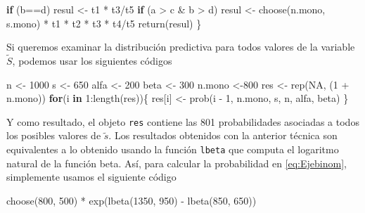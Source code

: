 \documentclass[
  spanish,
]{book}
\newenvironment{Shaded}{\begin{snugshade}}{\end{snugshade}}
\newcommand{\ConstantTok}[1]{\textcolor[rgb]{0.00,0.00,0.00}{#1}}
\newcommand{\ControlFlowTok}[1]{\textcolor[rgb]{0.13,0.29,0.53}{\textbf{#1}}}
\newcommand{\DecValTok}[1]{\textcolor[rgb]{0.00,0.00,0.81}{#1}}
\newcommand{\FunctionTok}[1]{\textcolor[rgb]{0.00,0.00,0.00}{#1}}
\newcommand{\NormalTok}[1]{#1}
\newcommand{\OtherTok}[1]{\textcolor[rgb]{0.56,0.35,0.01}{#1}}
\newcommand{\SpecialCharTok}[1]{\textcolor[rgb]{0.00,0.00,0.00}{#1}}
\theoremstyle{definition}
\theoremstyle{definition}
\theoremstyle{definition}
\theoremstyle{definition}
\theoremstyle{remark}
\begin{document}
\begin{Shaded}
\begin{Highlighting}[]
  \ControlFlowTok{if}\NormalTok{ (b}\SpecialCharTok{==}\NormalTok{d)}
\NormalTok{    resul }\OtherTok{\textless{}{-}}\NormalTok{ t1 }\SpecialCharTok{*}\NormalTok{ t3}\SpecialCharTok{/}\NormalTok{t5}
  \ControlFlowTok{if}\NormalTok{ (a }\SpecialCharTok{\textgreater{}}\NormalTok{ c }\SpecialCharTok{\&}\NormalTok{ b }\SpecialCharTok{\textgreater{}}\NormalTok{ d)}
\NormalTok{    resul }\OtherTok{\textless{}{-}} \FunctionTok{choose}\NormalTok{(n.mono, s.mono) }\SpecialCharTok{*}\NormalTok{ t1 }\SpecialCharTok{*}\NormalTok{ t2 }\SpecialCharTok{*}\NormalTok{ t3 }\SpecialCharTok{*}\NormalTok{ t4}\SpecialCharTok{/}\NormalTok{t5}
  \FunctionTok{return}\NormalTok{(resul) }
\NormalTok{  \}}
\end{Highlighting}
\end{Shaded}

Si queremos examinar la distribución predictiva para todos valores de la
variable \(\tilde{S}\), podemos usar los siguientes códigos

\begin{Shaded}
\begin{Highlighting}[]
\NormalTok{n }\OtherTok{\textless{}{-}} \DecValTok{1000}
\NormalTok{s }\OtherTok{\textless{}{-}} \DecValTok{650} 
\NormalTok{alfa }\OtherTok{\textless{}{-}} \DecValTok{200}
\NormalTok{beta }\OtherTok{\textless{}{-}} \DecValTok{300} 
\NormalTok{n.mono }\OtherTok{\textless{}{-}}\DecValTok{800}
\NormalTok{res }\OtherTok{\textless{}{-}} \FunctionTok{rep}\NormalTok{(}\ConstantTok{NA}\NormalTok{, (}\DecValTok{1} \SpecialCharTok{+}\NormalTok{ n.mono)) }
\ControlFlowTok{for}\NormalTok{(i }\ControlFlowTok{in} \DecValTok{1}\SpecialCharTok{:}\FunctionTok{length}\NormalTok{(res))\{}
\NormalTok{  res[i] }\OtherTok{\textless{}{-}} \FunctionTok{prob}\NormalTok{(i }\SpecialCharTok{{-}} \DecValTok{1}\NormalTok{, n.mono, s, n, alfa, beta)}
\NormalTok{\}}
\end{Highlighting}
\end{Shaded}

Y como resultado, el objeto \texttt{res} contiene las 801 probabilidades asociadas a todos los posibles valores de \(\tilde{s}\). Los resultados obtenidos con la anterior técnica son equivalentes a lo
obtenido usando la función \texttt{lbeta} que computa el logaritmo natural
de la función beta. Así, para calcular la probabilidad en
\eqref{eq:Ejebinom}, simplemente usamos el siguiente código

\begin{Shaded}
\begin{Highlighting}[]
\FunctionTok{choose}\NormalTok{(}\DecValTok{800}\NormalTok{, }\DecValTok{500}\NormalTok{) }\SpecialCharTok{*} \FunctionTok{exp}\NormalTok{(}\FunctionTok{lbeta}\NormalTok{(}\DecValTok{1350}\NormalTok{, }\DecValTok{950}\NormalTok{) }\SpecialCharTok{{-}} \FunctionTok{lbeta}\NormalTok{(}\DecValTok{850}\NormalTok{, }\DecValTok{650}\NormalTok{)) }
\end{Highlighting}
\end{Shaded}
\end{document}

